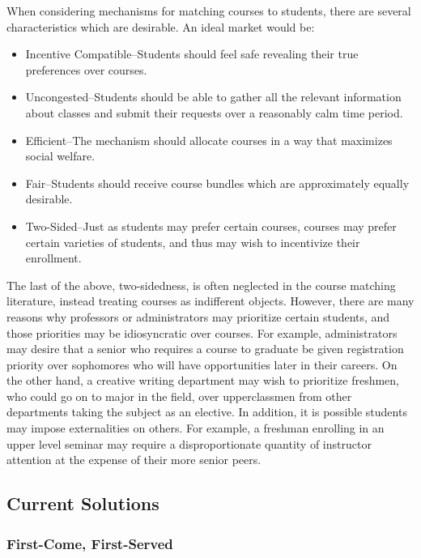 \documentclass{article}
\begin{document}
When considering mechanisms for matching courses to students, there are several characteristics which are desirable. An ideal market would be:
\begin{itemize}
    \item Incentive Compatible--Students should feel safe revealing their true preferences over courses.
    
    \item Uncongested--Students should be able to gather all the relevant information about classes and submit their requests over a reasonably calm time period.
    
    \item Efficient--The mechanism should allocate courses in a way that maximizes social welfare.
    
    \item Fair--Students should receive course bundles which are approximately equally desirable.
    
    \item Two-Sided--Just as students may prefer certain courses, courses may prefer certain varieties of students, and thus may wish to incentivize their enrollment. 
\end{itemize}

The last of the above, two-sidedness, is often neglected in the course matching literature, instead treating courses as indifferent objects. However, there are many reasons why professors or administrators may prioritize certain students, and those priorities may be idiosyncratic over courses. For example, administrators may desire that a senior who requires a course to graduate be given registration priority over sophomores who will have opportunities later in their careers. On the other hand, a creative writing department may wish to prioritize freshmen, who could go on to major in the field, over upperclassmen from other departments taking the subject as an elective. In addition, it is possible students may impose externalities on others. For example, a freshman enrolling in an upper level seminar may require a disproportionate quantity of instructor attention at the expense of their more senior peers.

\subsection{Current Solutions}

\subsubsection{First-Come, First-Served}
\end{document}
